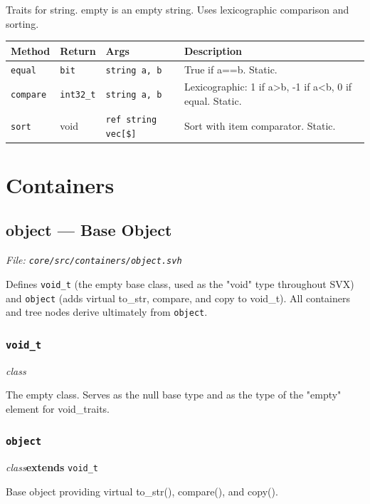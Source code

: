 \documentclass[11pt,letterpaper]{report}
\begin{document}
Traits for string. empty is an empty string. Uses lexicographic comparison and sorting.

\begin{xltabular}{\linewidth}{>{\small}p{1.35in} >{\small}p{1.25in} >{\small}p{0.95in} >{\small}X}
\toprule
\textbf{Method} & \textbf{Return} & \textbf{Args} & \textbf{Description} \\
\midrule
\endhead
\bottomrule
\endfoot
\texttt{equal} & \texttt{bit} & \texttt{string a, b} & True if a==b. Static. \\
\texttt{compare} & \texttt{int32\_t} & \texttt{string a, b} & Lexicographic: 1 if a\textgreater{}b, -1 if a\textless{}b, 0 if equal. Static. \\
\texttt{sort} & void & \texttt{ref string vec[\$]} & Sort with item comparator. Static. \\
\end{xltabular}

\chapter{Containers}
\section{object --- Base Object}
\noindent\small\textit{File: \texttt{core/src/containers/object.svh}}\par

Defines \texttt{void\_t} (the empty base class, used as the "void" type throughout SVX) and \texttt{object} (adds virtual to\_str, compare, and copy to void\_t). All containers and tree nodes derive ultimately from \texttt{object}.

\subsection*{\texttt{void\_t}}
\noindent\small\textit{class}\par

The empty class. Serves as the null base type and as the type of the "empty" element for void\_traits.


\subsection*{\texttt{object}}
\noindent\small\textit{class}\quad \textbf{extends} \texttt{void\_t}\par

Base object providing virtual to\_str(), compare(), and copy().
\end{document}
